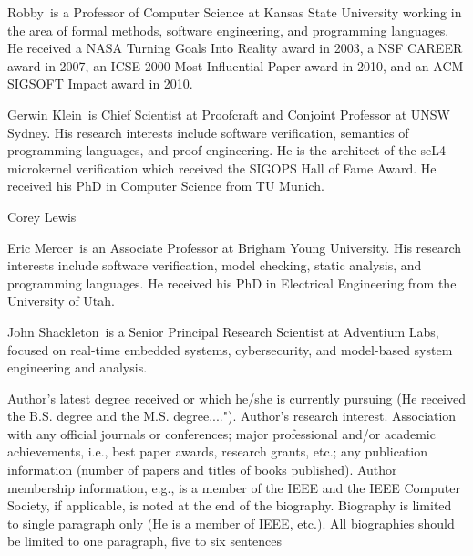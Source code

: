 \begin{IEEEbiography}{Robby}{\,}
is a Professor of Computer Science at Kansas State University working
in the area of formal methods, software engineering, and programming
languages.
He received a NASA Turning Goals Into Reality award in 2003,
a NSF CAREER award in 2007, an ICSE 2000 Most Influential Paper award in 2010,
and an ACM SIGSOFT Impact award in 2010.
\end{IEEEbiography}

\begin{IEEEbiography}{Gerwin Klein}{\,}
is Chief Scientist at Proofcraft and Conjoint Professor at UNSW Sydney. His
research interests include software verification, semantics of programming
languages, and proof engineering. He is the architect of the seL4 microkernel
verification which received the SIGOPS Hall of Fame Award. He received his PhD
in Computer Science from TU Munich.
\end{IEEEbiography}

\begin{IEEEbiography}{Corey Lewis}{\,}
\end{IEEEbiography}

\begin{IEEEbiography}{Eric Mercer}{\,}
  is an Associate Professor at Brigham Young University.
  His research interests include software verification, model checking, static analysis, and programming languages.
  He received his PhD in Electrical Engineering from the University of Utah.
\end{IEEEbiography}

\begin{IEEEbiography}{John Shackleton}{\,}
  is a Senior Principal Research Scientist at Adventium Labs,
  focused on real-time embedded systems, cybersecurity, and
  model-based system engineering and analysis.
\end{IEEEbiography}

Author's latest degree received or which he/she is currently pursuing
(He received the B.S. degree and the M.S. degree...."). Author's
research interest. Association with any official journals or
conferences; major professional and/or academic achievements, i.e.,
best paper awards, research grants, etc.; any publication information
(number of papers and titles of books published). Author membership
information, e.g., is a member of the IEEE and the IEEE Computer
Society, if applicable, is noted at the end of the
biography. Biography is limited to single paragraph only (He is a
member of IEEE, etc.). All biographies should be limited to one
paragraph, five to six sentences
